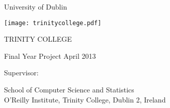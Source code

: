 \thispagestyle{empty}
\begin{center}
{\sffamily
{\Large University of Dublin}

\vspace{10pt}

\texttt{[image: trinitycollege.pdf]}

\vspace{10pt}

{\Huge TRINITY COLLEGE}

\vspace{80pt}

\textbf{ \Large \emph \projecttitle}

\vspace{30pt}

\authorname

\degreetitle

Final Year Project April 2013

Supervisor: \supervisorname

\vspace{130pt}

\large{School of Computer Science and Statistics
\\$ $\\
O'Reilly Institute, Trinity College, Dublin 2, Ireland}
\linespread{1}
}
\end{center}

